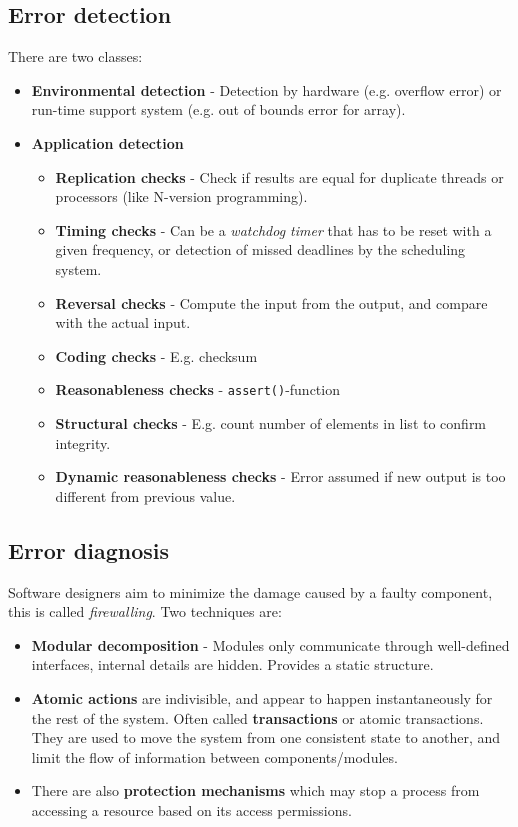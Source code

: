 \subsection{Error detection}\label{sec:error_detection}
There are two classes:
\begin{itemize}
    \item \textbf{Environmental detection} - Detection by hardware (e.g. overflow error) or run-time support system (e.g. out of bounds error for array).
    \item \textbf{Application detection}
    \begin{itemize}
        \item \textbf{Replication checks} - Check if results are equal for duplicate threads or processors (like N-version programming).
        \item \textbf{Timing checks} - Can be a \emph{watchdog timer} that has to be reset with a given frequency, or detection of missed deadlines by the scheduling system.
        \item \textbf{Reversal checks} - Compute the input from the output, and compare with the actual input.
        \item \textbf{Coding checks} - E.g. checksum
        \item \textbf{Reasonableness checks} - \texttt{assert()}-function
        \item \textbf{Structural checks} - E.g. count number of elements in list to confirm integrity.
        \item \textbf{Dynamic reasonableness checks} - Error assumed if new output is too different from previous value.
    \end{itemize}
\end{itemize}

\subsection{Error diagnosis}
Software designers aim to minimize the damage caused by a faulty component, this is called \emph{firewalling}. Two techniques are: 
\begin{itemize}
    \item \textbf{Modular decomposition} - Modules only communicate through well-defined interfaces, internal details are hidden. Provides a static structure.
    \item \textbf{Atomic actions} are indivisible, and appear to happen instantaneously for the rest of the system. Often called \textbf{transactions} or atomic transactions. They are used to move the system from one consistent state to another, and limit the flow of information between components/modules.
    \item There are also \textbf{protection mechanisms} which may stop a process from accessing a resource based on its access permissions.
\end{itemize}

